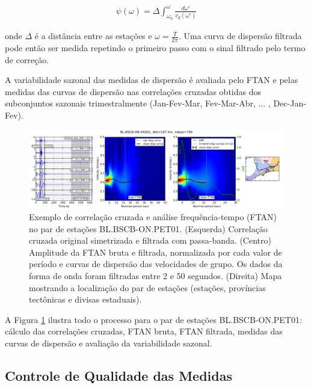 \begin{eqnarray}
\psi(\omega) = \Delta \int_{\omega_{0}}^{\omega} \frac{{d\omega}'}{v_{g}({\omega}')}
\end{eqnarray}

onde $\Delta$ é a distância entre as estações e $\omega = \frac{T}{2\pi}$. Uma curva de dispersão filtrada pode então ser medida repetindo o primeiro passo com o sinal filtrado pelo termo de correção.

A variabilidade sazonal das medidas de dispersão é avaliada pelo FTAN e pelas medidas das curvas de dispersão nas correlações cruzadas obtidas dos subconjuntos sazonais trimestralmente (Jan-Fev-Mar, Fev-Mar-Abr, ... , Dec-Jan-Fev). 

\begin{figure}[!ht]
\centering
\includegraphics[scale=0.35]{Figs/correlacao_FTAN.png}
\caption[Exemplo de correlação cruzada e análise frequência-tempo (FTAN) no par de estações BL.BSCB-ON.PET01.]{Exemplo de correlação cruzada e análise frequência-tempo (FTAN) no par de estações BL.BSCB-ON.PET01. (Esquerda) Correlação cruzada original simetrizada e filtrada com passa-banda. (Centro) Amplitude da FTAN bruta e filtrada, normalizada por cada valor de período e curvas de dispersão das velocidades de grupo. Os dados da forma de onda foram filtradas entre 2 e 50 segundos. (Direita) Mapa mostrando a localização do par de estações (estações, províncias tectônicas e divisas estaduais).}
\label{correlacao_FTAN}
\end{figure}

A Figura \ref{correlacao_FTAN} ilustra todo o processo para o par de estações BL.BSCB-ON.PET01: cálculo das correlações cruzadas, FTAN bruta, FTAN filtrada, medidas das curvas de dispersão e avaliação da variabilidade sazonal. 

\subsection{Controle de Qualidade das Medidas}

